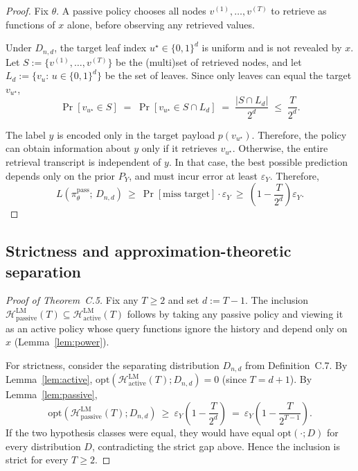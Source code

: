 \documentclass{llmxive}
\begin{document}
\begin{proof}
Fix \(\theta\). A passive policy chooses all nodes \(v^{(1)},\dots,v^{(T)}\) to retrieve as functions of \(x\) alone,
before observing any retrieved values.

Under \(D_{n,d}\), the target leaf index \(u^\star\in\{0,1\}^d\) is uniform and is not revealed by \(x\). Let
\(S:=\{v^{(1)},\dots,v^{(T)}\}\) be the (multi)set of retrieved nodes, and let \(L_d:=\{v_u:\, u\in\{0,1\}^d\}\) be the
set of leaves. Since only leaves can equal the target \(v_{u^\star}\),
\[
\Pr\!\left[v_{u^\star} \in S\right]
\;=\;
\Pr\!\left[v_{u^\star} \in S\cap L_d\right]
\;=\;
\frac{|S\cap L_d|}{2^d}
\;\le\;
\frac{T}{2^d}.
\]

The label \(y\) is encoded only in the target payload \(p(v_{u^\star})\). Therefore, the policy can obtain information
about \(y\) only if it retrieves \(v_{u^\star}\). Otherwise, the
entire retrieval transcript is independent of \(y\). In that case, the best possible prediction depends
only on the prior \(P_Y\), and must incur error at least \(\varepsilon_Y\). Therefore,
\[
L\!\left(\pi^{\mathrm{pass}}_\theta;\, D_{n,d}\right)
\ \ge\ \Pr[\text{miss target}] \cdot \varepsilon_Y
\ \ge\ \left(1-\frac{T}{2^d}\right)\varepsilon_Y.
\]
\end{proof}


\subsection{Strictness and approximation-theoretic separation}

\begin{proof}[Proof of Theorem~C.5]
Fix any \(T\ge 2\) and set \(d:=T-1\). The inclusion
\(\mathcal{H}^{\mathrm{LM}}_{\mathrm{passive}}(T)\subseteq \mathcal{H}^{\mathrm{LM}}_{\mathrm{active}}(T)\) follows by
taking any passive policy and viewing it as an active policy whose query functions ignore the history and depend only on
\(x\) (Lemma~\ref{lem:power}).

For strictness, consider the separating distribution \(D_{n,d}\) from Definition~C.7. By Lemma~\ref{lem:active},
\(\mathrm{opt}(\mathcal{H}^{\mathrm{LM}}_{\mathrm{active}}(T);D_{n,d})=0\) (since \(T=d+1\)). By Lemma~\ref{lem:passive},
\[
\mathrm{opt}(\mathcal{H}^{\mathrm{LM}}_{\mathrm{passive}}(T);D_{n,d})
\ \ge\ \varepsilon_Y\!\left(1-\frac{T}{2^d}\right)
\ =\ \varepsilon_Y\!\left(1-\frac{T}{2^{T-1}}\right).
\]
If the two hypothesis classes were equal, they would have equal \(\mathrm{opt}(\cdot;D)\) for every distribution \(D\),
contradicting the strict gap above. Hence the inclusion is strict for every \(T\ge 2\).
\end{proof}
\end{document}
